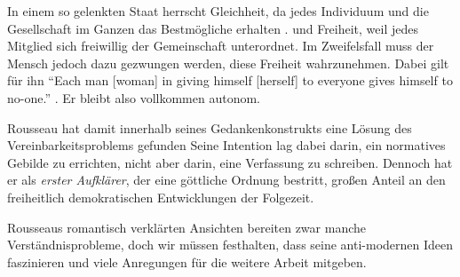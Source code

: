 In einem so gelenkten Staat herrscht Gleichheit, da jedes Individuum und die Gesellschaft im Ganzen das Bestmögliche erhalten \parencite[7]{Rousseau-1762-b}.
und Freiheit, weil jedes Mitglied sich freiwillig der Gemeinschaft unterordnet.
Im Zweifelsfall muss der Mensch jedoch dazu gezwungen werden, diese Freiheit wahrzunehmen.
Dabei gilt für ihn ``Each man [woman] in giving himself [herself] to everyone gives himself to no-one.'' \parencite[7][Anmerkung durch die Autoren]{Rousseau-1762-b}.
Er bleibt also vollkommen autonom.

Rousseau hat damit innerhalb seines Gedankenkonstrukts eine Lösung des Vereinbarkeitsproblems gefunden
Seine Intention lag dabei darin, ein normatives Gebilde zu errichten, nicht aber darin, eine Verfassung zu schreiben.
Dennoch hat er als \emph{erster Aufklärer}, der eine göttliche Ordnung bestritt, großen Anteil an den freiheitlich demokratischen Entwicklungen der Folgezeit.

Rousseaus romantisch verklärten Ansichten bereiten zwar manche Verständnisprobleme, doch wir müssen festhalten, dass seine anti-modernen Ideen faszinieren und viele Anregungen für die weitere Arbeit mitgeben.
